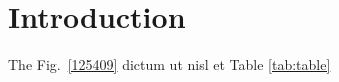 \section{Introduction}
\label{introduction}

The  Fig.~\ref{125409} dictum ut nisl et Table \ref{tab:table}

